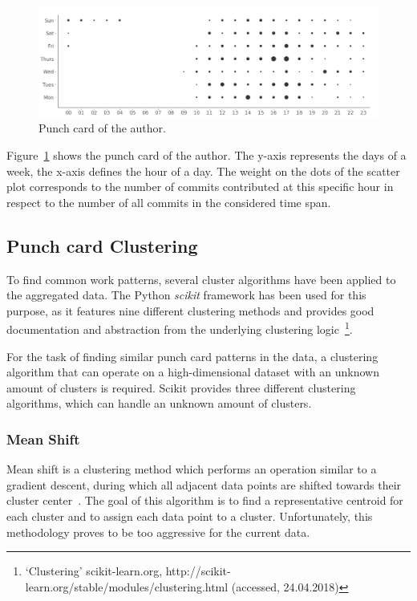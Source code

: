 \begin{figure}[h]
    \includegraphics[scale=0.32]{./graphs/analysis/ordered-punchcard}
    \centering
    \caption{Punch card of the author.}\label{fig:working-hour-rhythm-author}
\end{figure}

Figure~\ref{fig:working-hour-rhythm-author} shows the punch card of the author.
The y-axis represents the days of a week, the x-axis defines the hour of a day.
The weight on the dots of the scatter plot corresponds to the number of commits contributed at this specific hour in respect to the number of all commits in the considered time span.


\subsection{Punch card Clustering}

To find common work patterns, several cluster algorithms have been applied to the aggregated data.
The Python \emph{scikit} framework has been used for this purpose, as it features nine different clustering methods and provides good documentation and abstraction from the underlying clustering logic~\footnote{`Clustering' scikit-learn.org, http://scikit-learn.org/stable/modules/clustering.html (accessed, 24.04.2018)}.

For the task of finding similar punch card patterns in the data, a clustering algorithm that can operate on a high-dimensional dataset with an unknown amount of clusters is required.
Scikit provides three different clustering algorithms, which can handle an unknown amount of clusters.

\subsubsection{Mean Shift}\label{mean-shift}
Mean shift is a clustering method which performs an operation similar to a gradient descent, during which all adjacent data points are shifted towards their cluster center~\cite{article:mean-shift}.
The goal of this algorithm is to find a representative centroid for each cluster and to assign each data point to a cluster.
Unfortunately, this methodology proves to be too aggressive for the current data.

